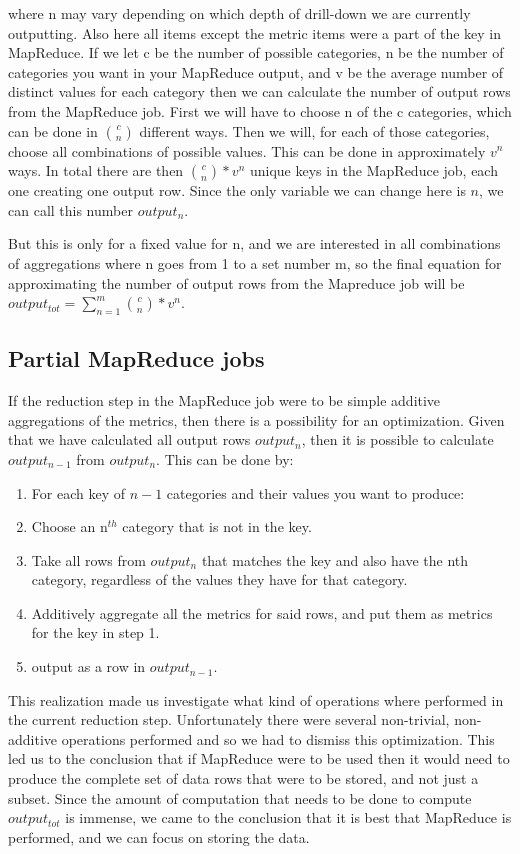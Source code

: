 \noindent where n may vary depending on which depth of drill-down we are currently outputting. Also here all items except the metric items were a part of the key in MapReduce. If we let c be the number of possible categories, n be the number of categories you want in your MapReduce output, and v be the average number of distinct values for each category then we can calculate the number of output rows from the MapReduce job. First we will have to choose n of the c categories, which can be done in ${ c\choose n}$ different ways. Then we will, for each of those categories, choose all combinations of possible values. This can be done in approximately $v^n$ ways. In total there are then ${c\choose n} * v^n$ unique keys in the MapReduce job, each one creating one output row. Since the only variable we can change here is $n$, we can call this number $output_n$.

But this is only for a fixed value for n, and we are interested in all combinations of aggregations where n goes from 1 to a set number m, so the final equation for approximating the number of output rows from the Mapreduce job will be $output_{tot} = \displaystyle\sum\limits_{n=1}^m {c\choose n} * v^n$. 

\subsection{Partial MapReduce jobs}
If the reduction step in the MapReduce job were to be simple additive aggregations of the metrics, then there is a possibility for an optimization. Given that we have calculated all output rows $output_n$, then it is possible to calculate $output_{n-1}$ from $output_n$. This can be done by:
\begin{enumerate}
\item For each key of $n-1$ categories and their values you want to produce:
\item Choose an n$^{th}$ category that is not in the key.
\item Take all rows from $output_n$ that matches the key and also have the nth category, regardless of the values they have for that category.
\item Additively aggregate all the metrics for said rows, and put them as metrics for the key in step 1. 
\item output as a row in $output_{n-1}$.
\end{enumerate}

This realization made us investigate what kind of operations where performed in the current reduction step. Unfortunately there were several non-trivial, non-additive operations performed and so we had to dismiss this optimization. This led us to the conclusion that if MapReduce were to be used then it would need to produce the complete set of data rows that were to be stored, and not just a subset. Since the amount of computation that needs to be done to compute $output_{tot}$ is immense, we came to the conclusion that it is best that MapReduce is performed, and we can focus on storing the data.

